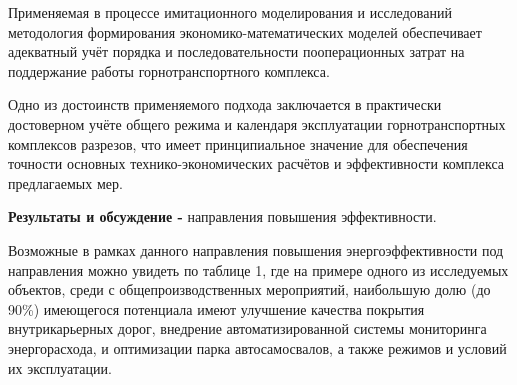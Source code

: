 \begin{multicols}{2}
Применяемая в процессе имитационного моделирования и исследований
методология формирования экономико-математических моделей обеспечивает
адекватный учёт порядка и последовательности пооперационных затрат на
поддержание работы горнотранспортного комплекса.

Одно из достоинств применяемого подхода заключается в практически
достоверном учёте общего режима и календаря эксплуатации
горнотранспортных комплексов разрезов, что имеет принципиальное значение
для обеспечения точности основных технико-экономических расчётов и
эффективности комплекса предлагаемых мер.

{\bfseries Результаты и обсуждение -} направления повышения эффективности.

Возможные в рамках данного направления повышения энергоэффективности под
направления можно увидеть по таблице 1, где на примере одного из
исследуемых объектов, среди с общепроизводственных мероприятий,
наибольшую долю (до 90\%) имеющегося потенциала имеют улучшение качества
покрытия внутрикарьерных дорог, внедрение автоматизированной системы
мониторинга энергорасхода, и оптимизации парка автосамосвалов, а также
режимов и условий их эксплуатации.
\end{multicols}


